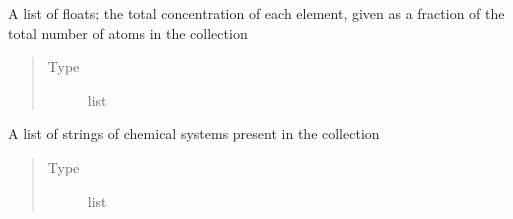 \documentclass[letterpaper,10pt,english]{sphinxmanual}
\begin{document}
\begin{fulllineitems}
\begin{fulllineitems}
\begin{quote}
\begin{description}
\end{description}\end{quote}

\end{fulllineitems}


\begin{fulllineitems}
\label{\detokenize{configuration_set:colabfit.tools.configuration_sets.ConfigurationSet.elements_ratios}}
\sphinxAtStartPar
A list of floats; the total concentration of each element, given as
a fraction of the total number of atoms in the collection
\begin{quote}\begin{description}
\item[{Type}] \leavevmode
\sphinxAtStartPar
list

\end{description}\end{quote}

\end{fulllineitems}


\begin{fulllineitems}
\label{\detokenize{configuration_set:colabfit.tools.configuration_sets.ConfigurationSet.chemical_systems}}
\sphinxAtStartPar
A list of strings of chemical systems present in the collection
\begin{quote}\begin{description}
\item[{Type}] \leavevmode
\sphinxAtStartPar
list

\end{description}\end{quote}

\end{fulllineitems}



\end{fulllineitems}
\end{document}

